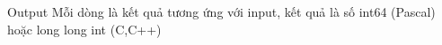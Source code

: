 Output
Mỗi dòng là kết quả tương ứng với input, kết quả là số int64 (Pascal) hoặc long long int (C,C++)
